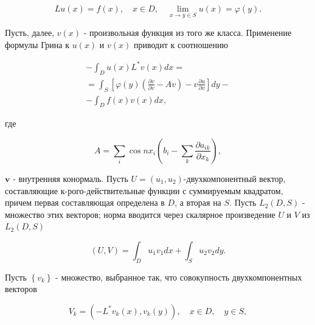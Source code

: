 \documentclass[10pt]{article}
\begin{document}
\[

L u(x)=f(x), \quad x \in D, \quad \lim _{x \rightarrow y \in S} u(x)=\varphi(y) .

\]



Пусть, далее, $v(x)$ - произвольная функция из того же класса. Применение формулы Грина к $u(x)$ и $v(x)$ приводит к соотношению



\[

\begin{gathered}

-\int_{D} u(x) L^{*} v(x) d x= \\

=\int_{S}\left[\varphi(y)\left(\frac{\partial v}{\partial v}-A v\right)-v \frac{\partial u}{\partial v}\right] d y- \\

-\int_{D} f(x) v(x) d x,

\end{gathered}

\]



где



\[

A=\sum_{i} \cos n x_{i}\left(b_{i}-\sum_{k} \frac{\partial a_{i k}}{\partial x_{k}}\right),

\]



$\boldsymbol{v}$ - внутренняя конормаль. Пусть $U=\left(u_{1}, u_{2}\right)$-двухкомпонентный вектор, составляющие к-рого-действительные функции с суммируемым квадратом, причем первая составляющая определена в $D$, а вторая на $S$. Пусть $L_{2}(D, S)$ - множество этих векторов; норма вводится через скалярное произведение $U$ и $V$ из $L_{2}(D, S)$



\[

(U, V)=\int_{D} u_{1} v_{1} d x+\int_{S} u_{2} v_{2} d y .

\]



Пусть $\left\{v_{k}\right\}$ - множество, выбранное так, что совокупность двухкомпонентных векторов



\[

V_{k}=\left(-L^{*} v_{k}(x), v_{k}(y)\right), \quad x \in D, \quad y \in S,

\]
\end{document}
